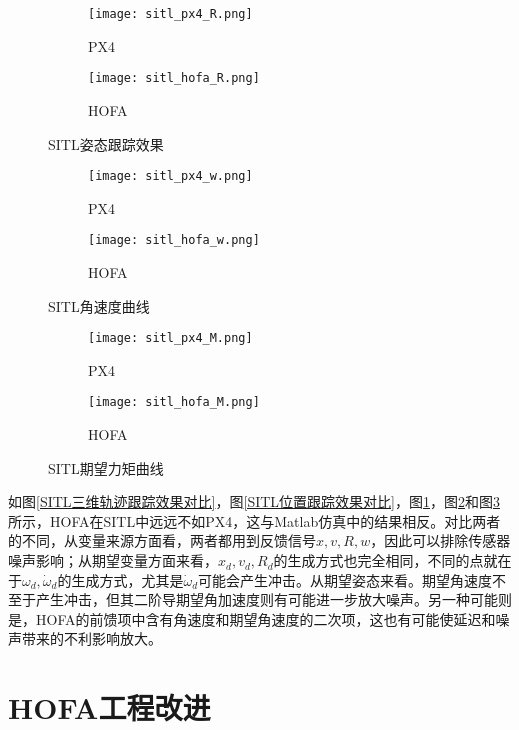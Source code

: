 \begin{figure}[H]
  \centering
\begin{subfigure}[b]{0.49\linewidth}
    \texttt{[image: sitl\_px4\_R.png]}
    \caption{PX4}
\end{subfigure}
\hfill
\begin{subfigure}[b]{0.49\linewidth}
    \texttt{[image: sitl\_hofa\_R.png]}
    \caption{HOFA}
\end{subfigure}
\caption{SITL姿态跟踪效果}
\label{SITL姿态跟踪效果}
\end{figure}

\begin{figure}[H]
  \centering
\begin{subfigure}[b]{0.49\linewidth}
    \texttt{[image: sitl\_px4\_w.png]}
    \caption{PX4}
\end{subfigure}
\hfill
\begin{subfigure}[b]{0.49\linewidth}
    \texttt{[image: sitl\_hofa\_w.png]}
    \caption{HOFA}
\end{subfigure}
\caption{SITL角速度曲线}
\label{SITL角速度曲线}
\end{figure}


\begin{figure}[H]
  \centering
\begin{subfigure}[b]{0.49\linewidth}
    \texttt{[image: sitl\_px4\_M.png]}
    \caption{PX4}
\end{subfigure}
\hfill
\begin{subfigure}[b]{0.49\linewidth}
    \texttt{[image: sitl\_hofa\_M.png]}
    \caption{HOFA}
\end{subfigure}
\caption{SITL期望力矩曲线}
\label{SITL期望力矩曲线}
\end{figure}

如图\ref{SITL三维轨迹跟踪效果对比}，图\ref{SITL位置跟踪效果对比}，图\ref{SITL姿态跟踪效果}，图\ref{SITL角速度曲线}和图\ref{SITL期望力矩曲线}所示，HOFA在SITL中远远不如PX4，这与Matlab仿真中的结果相反。对比两者的不同，从变量来源方面看，两者都用到反馈信号$x,v,R,w$，因此可以排除传感器噪声影响；从期望变量方面来看，$x_d,v_d,R_d$的生成方式也完全相同，不同的点就在于$\omega_d,\dot \omega_d$的生成方式，尤其是$\dot \omega_d$可能会产生冲击。从期望姿态来看。期望角速度不至于产生冲击，但其二阶导期望角加速度则有可能进一步放大噪声。另一种可能则是，HOFA的前馈项中含有角速度和期望角速度的二次项，这也有可能使延迟和噪声带来的不利影响放大。

\section{HOFA工程改进}

